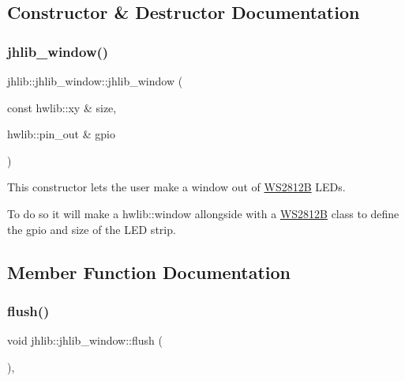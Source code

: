 \subsection{Constructor \& Destructor Documentation}
\mbox{\label{classjhlib_1_1jhlib__window_ac2679bd5cd146f19826ac694359f6f60}} 
\subsubsection{\texorpdfstring{jhlib\+\_\+window()}{jhlib\_window()}}
{\footnotesize\ttfamily jhlib\+::jhlib\+\_\+window\+::jhlib\+\_\+window (\begin{DoxyParamCaption}\item[{const hwlib\+::xy \&}]{size,  }\item[{hwlib\+::pin\+\_\+out \&}]{gpio }\end{DoxyParamCaption})\hspace{0.3cm}{\ttfamily [inline]}}



This constructor lets the user make a window out of \hyperlink{classjhlib_1_1WS2812B}{W\+S2812B} L\+E\+Ds. 

To do so it will make a hwlib\+::window allongside with a \hyperlink{classjhlib_1_1WS2812B}{W\+S2812B} class to define the gpio and size of the L\+ED strip. 

\subsection{Member Function Documentation}
\mbox{\label{classjhlib_1_1jhlib__window_a99393d541e7e42b65c4a1b5421696118}} 
\subsubsection{\texorpdfstring{flush()}{flush()}}
{\footnotesize\ttfamily void jhlib\+::jhlib\+\_\+window\+::flush (\begin{DoxyParamCaption}{ }\end{DoxyParamCaption})\hspace{0.3cm}{\ttfamily [inline]}, {\ttfamily [override]}}



